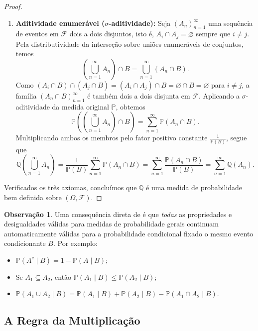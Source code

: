 \documentclass[12pt,portuguese]{article}
\let\le\leqslant
\theoremstyle{definition}
\newtheorem{remark}[remark]{Observação}
\begin{document}
\begin{proof}
\begin{enumerate}[label=\textbf{Axioma \arabic*:},leftmargin=*]
  \item \textbf{Aditividade enumerável (\(\sigma\)-aditividade):} Seja \((A_n)_{n=1}^{\infty}\) uma sequência de eventos em \(\mathcal{F}\) dois a dois disjuntos, isto é, \(A_i \cap A_j = \varnothing\) sempre que \(i \ne j\). Pela distributividade da interseção sobre uniões enumeráveis de conjuntos, temos
  \[
    \left(\bigcup_{n=1}^{\infty} A_n\right) \cap B = \bigcup_{n=1}^{\infty} (A_n \cap B).
  \]
  Como \((A_i \cap B) \cap (A_j \cap B) = (A_i \cap A_j) \cap B = \varnothing \cap B = \varnothing\) para \(i \ne j\), a família \((A_n \cap B)_{n=1}^{\infty}\) é também dois a dois disjunta em \(\mathcal{F}\). Aplicando a \(\sigma\)-aditividade da medida original \(\mathbb{P}\), obtemos
  \[
    \mathbb{P}\left(\left(\bigcup_{n=1}^{\infty} A_n\right) \cap B\right) = \sum_{n=1}^{\infty} \mathbb{P}(A_n \cap B).
  \]
  Multiplicando ambos os membros pelo fator positivo constante \(\frac{1}{\mathbb{P}(B)}\), segue que
  \[
    \mathbb{Q}\left(\bigcup_{n=1}^{\infty} A_n\right) = \frac{1}{\mathbb{P}(B)}\sum_{n=1}^{\infty} \mathbb{P}(A_n \cap B) = \sum_{n=1}^{\infty} \frac{\mathbb{P}(A_n \cap B)}{\mathbb{P}(B)} = \sum_{n=1}^{\infty} \mathbb{Q}(A_n).
  \]
\end{enumerate}
Verificados os três axiomas, concluímos que \(\mathbb{Q}\) é uma medida de probabilidade bem definida sobre \((\Omega, \mathcal{F})\).
\end{proof}

\begin{remark}
Uma consequência direta de  é que \emph{todas} as propriedades e desigualdades válidas para medidas de probabilidade gerais continuam automaticamente válidas para a probabilidade condicional fixado o mesmo evento condicionante \(B\). Por exemplo:
\begin{itemize}
  \item \(\mathbb{P}(A^c \mid B) = 1 - \mathbb{P}(A \mid B)\);
  \item Se \(A_1 \subseteq A_2\), então \(\mathbb{P}(A_1 \mid B) \le \mathbb{P}(A_2 \mid B)\);
  \item \(\mathbb{P}(A_1 \cup A_2 \mid B) = \mathbb{P}(A_1 \mid B) + \mathbb{P}(A_2 \mid B) - \mathbb{P}(A_1 \cap A_2 \mid B)\).
\end{itemize}
\end{remark}

\subsection{A Regra da Multiplicação}
\end{document}
